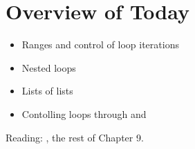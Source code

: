 \documentclass[letterpaper,10pt,english]{sphinxmanual}
\begin{document}
\section{Overview of Today}
\label{\detokenize{lecture_notes/lec12_loops2_for_double:overview-of-today}}\begin{itemize}
\item {} 
Ranges and control of loop iterations

\item {} 
Nested loops

\item {} 
Lists of lists

\item {} 
Contolling loops through  and 

\end{itemize}

Reading: , the rest of Chapter 9.
\end{document}
